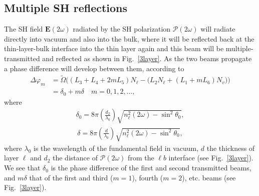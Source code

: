 \subsection{Multiple SH reflections}

The SH field $\mathbf{E}(2\omega)$ radiated by the SH polarization 
$\boldsymbol{\mathcal{P}}(2\omega)$
will radiate directly into vacuum and also into the bulk,
where it will be reflected back at the thin-layer-bulk interface into 
the thin layer again and this beam will be multiple-transmitted and 
reflected as shown in Fig.~\ref{3layer}. 
As the two beams propagate a phase difference will develop between
them, according to
\begin{align}\label{m99}
\Delta\varphi_m&=\tilde\Omega\Big((L_{3} + L_{4} + 2mL_{5})N_{\ell}
-\big(L_{2}N_{\ell} + (L_{1} + mL_{6})N_{v}\big)
\Big)
\nonumber\\
&=\delta_{0} + m\delta\quad m=0,1,2,\ldots
,
\end{align}
where
\begin{align}\label{m97}
\delta_{0}=8\pi\left(\frac{d_2}{\lambda_0}\right)\sqrt{n^2_\ell(2\omega)-\sin^2\theta_{0}}
,
\end{align}
\begin{align}\label{m96}
\delta=8\pi\left(\frac{d}{\lambda_0}\right)\sqrt{n^2_\ell(2\omega)-\sin^2\theta_{0}}
,
\end{align}
where $\lambda_0$ is the wavelength of the fundamental field in
vacuum, $d$ the thickness of layer $\ell$ and $d_2$ the distance of
$\boldsymbol{\mathcal{P}}(2\omega)$  
from the $\ell b$ interface 
(see Fig.~\ref{3layer}).
We see that
$\delta_{0}$ is the phase difference of 
the first and second transmitted beams, and $m\delta$ that of the first 
and  third ($m=1$), fourth ($m=2$), etc. beams (see 
Fig.~\ref{3layer}). 

